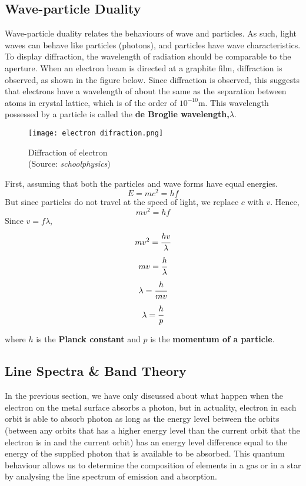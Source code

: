 \documentclass{article}
\begin{document}
 \subsection{Wave-particle Duality}

 
 Wave-particle duality relates the behaviours of wave and particles. As such, light waves can behave like particles (photons), and particles have wave characteristics.
 To display diffraction, the wavelength of radiation should be comparable to the aperture. When an electron beam is directed at a graphite film, diffraction is observed, as shown in the figure below. Since diffraction is observed, this suggests that electrons have a wavelength of about the same as the separation between atoms in crystal lattice, which is of the order of $10^{-10}$m. This wavelength possessed by a particle is called the \textbf{de Broglie wavelength,$\lambda$}.
 \begin{figure}[H]
    \centering
    \captionsetup{justification=centering,margin=2cm}
    \texttt{[image: electron difraction.png]}
    \caption*{Diffraction of electron \\ (Source: \textit{schoolphysics})}
\end{figure}
 First, assuming that both the particles and wave forms have equal energies.
 $$E=mc^2=hf$$
But since particles do not travel at the speed of light, we replace $c$ with $v$. Hence,
$$mv^2=hf$$
Since $v=f\lambda$,
$$mv^2=\cfrac{hv}{\lambda}$$
$$mv=\cfrac{h}{\lambda}$$
$$\lambda=\cfrac{h}{mv}$$
$$\lambda=\cfrac{h}{p}$$
 
 
 where $h$ is the \textbf{Planck constant} and $p$ is the \textbf{momentum of a particle}.


 
 
 \subsection{Line Spectra \& Band Theory}

 
 In the previous section, we have only discussed about what happen when the electron on the metal surface absorbs a photon, but in actuality, electron in each orbit is able to absorb photon as long as the energy level between the orbits (between any orbits that has a higher energy level than the current orbit that the electron is in and the current orbit) has an energy level difference equal to the energy of the supplied photon that is available to be absorbed. This quantum behaviour allows us to determine the composition of elements in a gas or in a star by analysing the line spectrum of emission and absorption.
 
\end{document}
